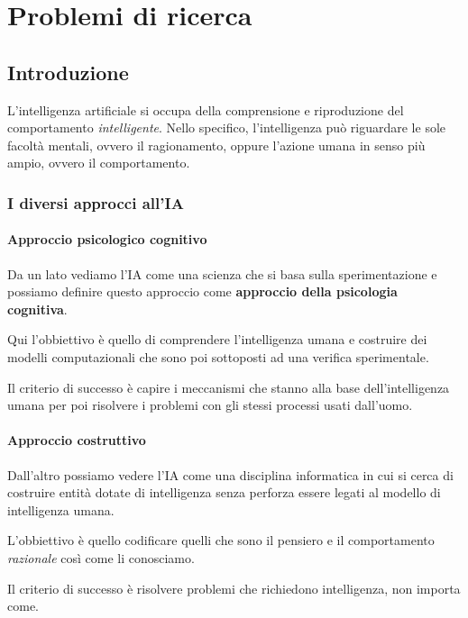 \part{Problemi di ricerca}
\chapter{Introduzione}
L'intelligenza artificiale si occupa della comprensione e riproduzione del
comportamento \emph{intelligente}. Nello specifico, l'intelligenza pu\`o riguardare
le sole facolt\`a mentali, ovvero il ragionamento, oppure l'azione umana in senso
pi\`u ampio, ovvero il comportamento.

\section{I diversi approcci all'IA}
\subsection{Approccio psicologico cognitivo}
Da un lato vediamo l'IA come una scienza che si basa sulla sperimentazione e possiamo
definire questo approccio come \textbf{approccio della psicologia cognitiva}.

Qui  l'obbiettivo \`e quello di comprendere l'intelligenza umana e costruire dei
modelli computazionali che sono poi sottoposti ad una verifica sperimentale.

Il criterio di successo \`e capire i meccanismi che stanno alla base
dell'intelligenza umana per poi risolvere i problemi con gli stessi processi usati
dall'uomo.

\subsection{Approccio costruttivo}
Dall'altro possiamo vedere l'IA come una disciplina informatica in cui si cerca di
costruire entit\`a dotate di intelligenza senza perforza essere legati al modello di
intelligenza umana.

L'obbiettivo \`e quello codificare quelli che sono il pensiero e il comportamento
\emph{razionale} cos\`i come li conosciamo.

Il criterio di successo \`e risolvere problemi che richiedono intelligenza, non
importa come.

